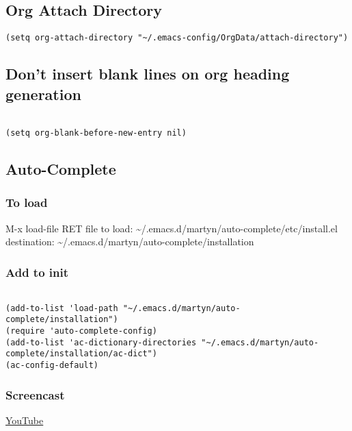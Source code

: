 \documentclass[colorlinks=true,urlcolor=blue,listings-sv]{article}
\begin{document}
\subsection{Org Attach Directory}
\label{sec-1-35}



\lstset{language=Lisp}
\begin{lstlisting}
(setq org-attach-directory "~/.emacs-config/OrgData/attach-directory")
\end{lstlisting}
\subsection{Don't insert blank lines on org heading generation}
\label{sec-1-36}



\lstset{language=Lisp}
\begin{lstlisting}

(setq org-blank-before-new-entry nil)
\end{lstlisting}
\subsection{Auto-Complete}
\label{sec-1-37}
\subsubsection{To load}
\label{sec-1-37-1}


M-x load-file RET 
file to load: \~{}/.emacs.d/martyn/auto-complete/etc/install.el
destination: \~{}/.emacs.d/martyn/auto-complete/installation
\subsubsection{Add to init}
\label{sec-1-37-2}



\lstset{language=Lisp}
\begin{lstlisting}

(add-to-list 'load-path "~/.emacs.d/martyn/auto-complete/installation")
(require 'auto-complete-config)
(add-to-list 'ac-dictionary-directories "~/.emacs.d/martyn/auto-complete/installation/ac-dict")
(ac-config-default)
\end{lstlisting}
\subsubsection{Screencast}
\label{sec-1-37-3}


\href{http://www.youtube.com/watch?v%3DrGVVnDxwJYE}{YouTube}
\end{document}
